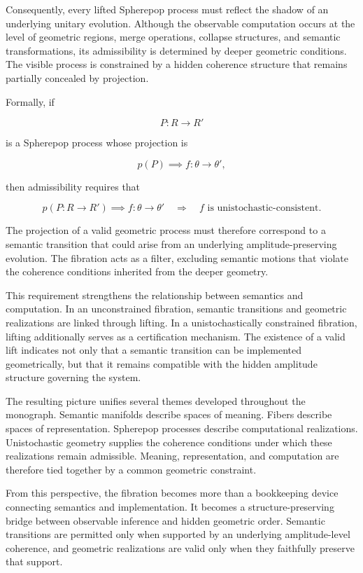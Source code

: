 \documentclass[12pt,letterpaper]{article}
\theoremstyle{remark}
\begin{document}
Consequently, every lifted Spherepop process must reflect the shadow of an underlying unitary evolution. Although the observable computation occurs at the level of geometric regions, merge operations, collapse structures, and semantic transformations, its admissibility is determined by deeper geometric conditions. The visible process is constrained by a hidden coherence structure that remains partially concealed by projection.

Formally, if

\[
P : R \to R'
\]

is a Spherepop process whose projection is

\[
p(P) \implies f : \theta \to \theta',
\]

then admissibility requires that

\[
p(P : R \to R') \implies f : \theta \to \theta'
\quad\Rightarrow\quad
f \text{ is unistochastic-consistent.}
\]

The projection of a valid geometric process must therefore correspond to a semantic transition that could arise from an underlying amplitude-preserving evolution. The fibration acts as a filter, excluding semantic motions that violate the coherence conditions inherited from the deeper geometry.

This requirement strengthens the relationship between semantics and computation. In an unconstrained fibration, semantic transitions and geometric realizations are linked through lifting. In a unistochastically constrained fibration, lifting additionally serves as a certification mechanism. The existence of a valid lift indicates not only that a semantic transition can be implemented geometrically, but that it remains compatible with the hidden amplitude structure governing the system.

The resulting picture unifies several themes developed throughout the monograph. Semantic manifolds describe spaces of meaning. Fibers describe spaces of representation. Spherepop processes describe computational realizations. Unistochastic geometry supplies the coherence conditions under which these realizations remain admissible. Meaning, representation, and computation are therefore tied together by a common geometric constraint.

From this perspective, the fibration becomes more than a bookkeeping device connecting semantics and implementation. It becomes a structure-preserving bridge between observable inference and hidden geometric order. Semantic transitions are permitted only when supported by an underlying amplitude-level coherence, and geometric realizations are valid only when they faithfully preserve that support.
\end{document}
